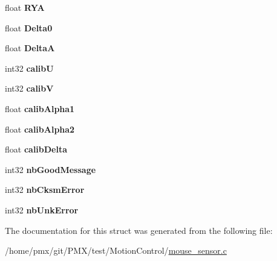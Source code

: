 \begin{DoxyCompactItemize}
float {\bfseries R\+YA}
\item 
\mbox{\label{structMOUSE_a2a43467a1b3904c75ebfc0e1ee568f0c}} 
float {\bfseries Delta0}
\item 
\mbox{\label{structMOUSE_a3f64b0ad67f3d03af799dcbae8a63a76}} 
float {\bfseries DeltaA}
\item 
\mbox{\label{structMOUSE_aa5cbd81e9f4807639b0bd3ff393c9164}} 
int32 {\bfseries calibU}
\item 
\mbox{\label{structMOUSE_ad86da27bdad1a77042c9252029674427}} 
int32 {\bfseries calibV}
\item 
\mbox{\label{structMOUSE_afcb285a008c33a447111269a65da3ac2}} 
float {\bfseries calib\+Alpha1}
\item 
\mbox{\label{structMOUSE_a73f1bafc331726987c4710809c856185}} 
float {\bfseries calib\+Alpha2}
\item 
\mbox{\label{structMOUSE_a501ef2a40cfd6f5e82dd50673d6b1e68}} 
float {\bfseries calib\+Delta}
\item 
\mbox{\label{structMOUSE_ad46931ceeb367884db14ff38c5d3a375}} 
int32 {\bfseries nb\+Good\+Message}
\item 
\mbox{\label{structMOUSE_a230b983bf4171350081b93784dbeac3d}} 
int32 {\bfseries nb\+Cksm\+Error}
\item 
\mbox{\label{structMOUSE_a189f52f43e01a2a6dddf2590e76b626e}} 
int32 {\bfseries nb\+Unk\+Error}
\end{DoxyCompactItemize}


The documentation for this struct was generated from the following file\+:\begin{DoxyCompactItemize}
\item 
/home/pmx/git/\+P\+M\+X/test/\+Motion\+Control/\hyperlink{mouse__sensor_8c}{mouse\+\_\+sensor.\+c}\end{DoxyCompactItemize}
